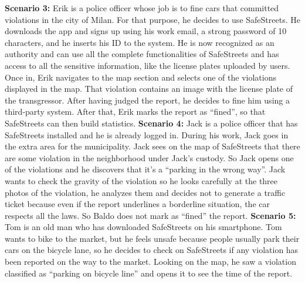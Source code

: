 \documentclass[../RASD.tex]{subfiles}
\begin{document}
                \newline
                \newline
                \textbf{Scenario 3:} Erik is a police officer whose job is to fine cars that committed violations in the city of Milan.
                For that purpose, he decides to use SafeStreets.
                He downloads the app and signs up using his work email, a strong password of 10 characters, and he inserts his ID to the system.
                He is now recognized as an authority and can use all the complete functionalities of SafeStreets and has access to all the sensitive information,
                like the license plates uploaded by users.
                Once in, Erik navigates to the map section and selects one of the violations displayed in the map.
                That violation contains an image with the license plate of the transgressor.
                After having judged the report, he decides to fine him using a third-party system.
                After that, Erik marks the report as “fined”, so that SafeStreets can then build statistics.
                \newline
                \newline
                \textbf{Scenario 4:} Jack is a police officer that has SafeStreets installed and he is already logged in.
                During his work, Jack goes in the extra area for the municipality.
                Jack sees on the map of SafeStreets that there are some violation in the neighborhood under Jack’s custody.
                So Jack opens one of the violations and he discovers that it’s a “parking in the wrong way”.
                Jack wants to check the gravity of the violation so he looks carefully at the three photos of the violation,
                he analyzes them and decides not to generate a traffic ticket because even if the report underlines a borderline situation,
                the car respects all the laws.
                So Baldo does not mark as “fined” the report.
                \newline
                \newline
                \textbf{Scenario 5:} Tom is an old man who has downloaded SafeStreets on his smartphone.
                Tom wants to bike to the market, but he feels unsafe because people usually park their cars on the bicycle lane,
                so he decides to check on SafeStreets if any violation has been reported on the way to the market.
                Looking on the map, he saw a violation classified as “parking on bicycle line” and opens it to see the time of the report.
\end{document}
